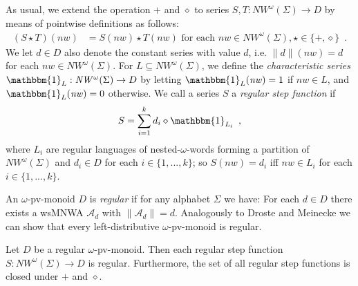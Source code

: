 \documentclass[runningheads, envcountsame, a4paper]{llncs}
\begin{document}
\begin{example}
\begin{center}
	\end{center}
\end{example}
As usual, we extend the operation $+$ and $\diamond$ to series $S,T:\mathit{NW^\omega}(\Sigma) \rightarrow D$ by means of pointwise definitions as follows:
\begin{align*}
(S \star T)(\mathit{nw}) &= S(\mathit{nw}) \star T(\mathit{nw}) \mbox{ for each } \mathit{nw} \in \mathit{NW^\omega}(\Sigma), \star \in \{{+},{\diamond}\} \enspace .
\end{align*}
We let $d \in D$ also denote the constant series with value $d$, i.e. $\lVert d \rVert(\mathit{nw}) = d$ for each $\mathit{nw} \in \mathit{NW^\omega}(\Sigma)$.
For $L\subseteq \mathit{NW^\omega}(\Sigma)$, we define the \emph{characteristic series} $\mathbbm{1}_{L}:\mathit{NW^\omega}(\Sigma) \rightarrow D$ by letting $\mathbbm{1}_{L}(\mathit{nw})=1$ if $\mathit{nw} \in L$, and $\mathbbm{1}_{L}(\mathit{nw})=0$ otherwise.
We call a series $S$ a \emph{regular step function} if
\begin{align} \label{defrsf} S=\sum_{i=1}^k d_i \diamond \mathbbm{1}_{L_i}\enspace ,
\end{align}
where $L_i$ are regular languages of nested-$\omega$-words
	forming a partition of $\mathit{NW^\omega}(\Sigma)$ and $d_i \in D$ for each $i \in \{1,...,k\}$; so
	$S(\mathit{nw})=d_i$ iff $\mathit{nw} \in L_i$
	for each $i \in \{1,...,k\}$.
\par
An $\omega$-pv-monoid $D$ is \emph{regular} if for any alphabet $\Sigma$ we have: For each $d \in D$ there exists a wsMNWA $\mathcal{A}_d$ with $\lVert \mathcal{A}_d \rVert= d$. Analogously to Droste and Meinecke \cite{DM} we can show that every left-distributive $\omega$-pv-monoid is regular. \begin{Satz}
\label{rsfreg}
	Let $D$ be a regular $\omega$-pv-monoid. Then each regular step function $S:\mathit{NW^\omega}(\Sigma) \rightarrow D$ is regular. Furthermore, the set of all regular step functions is closed under $+$ and $\diamond$.
\end{Satz}
\end{document}
